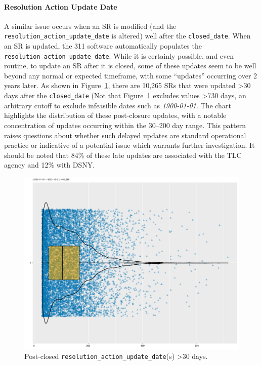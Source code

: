 \documentclass[linenumber]{jdsart}
\begin{document}
\paragraph{Resolution Action Update Date}
A similar issue occurs when an SR is modified (and the \texttt{resolution\_action\_update\_date} is altered) well 
after the \texttt{closed\_date}.  When an SR is 
updated, the 311 software automatically populates the \texttt{resolution\_action\_update\_date}. While it is certainly 
possible, and even routine, to update an SR after it is closed, 
some of these updates seem to be well beyond any 
normal or expected timeframe, with some ``updates'' 
occurring over 2 years later. As shown in Figure~\ref{fig:resolution-violin}, 
there are 10,265 SRs that were updated >30 days after the 
\texttt{closed\_date} (Not that Figure~\ref{fig:resolution-violin} excludes 
values >730 days, an arbitrary cutoff to exclude 
infeasible dates such as \textit{1900-01-01}. The chart 
highlights the distribution of these post-closure 
 updates, with a notable concentration of updates occurring within 
the 30--200 day range. This pattern raises 
questions about whether such delayed updates are standard 
operational practice or indicative of a potential issue 
which warrants further investigation. It should be noted
that 84\% of these late updates are associated with the TLC agency
and 12\% with DSNY.

\begin{figure}[tbp]
  \centering
  \includegraphics[width=\textwidth]{post_closed_violin_chart.pdf}
  \caption{Post-closed \texttt{resolution\_action\_update\_date}(s) >30 days.}
  \label{fig:resolution-violin}
\end{figure}
\end{document}
